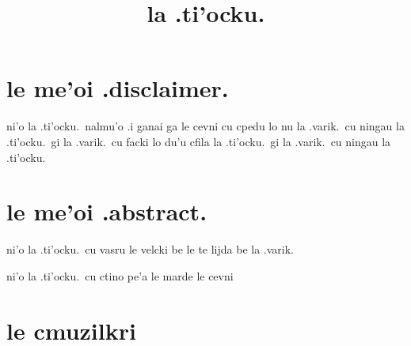 \documentclass{report}
\title{la .ti'ocku.}
\begin{document}
\maketitle

\chapter{le me'oi .disclaimer.}
ni'o la .ti'ocku.\ nalmu'o  .i ganai ga le cevni cu cpedu lo nu la .varik.\ cu ningau la .ti'ocku.\ gi la .varik.\ cu facki lo du'u cfila la .ti'ocku.\ gi la .varik.\ cu ningau la .ti'ocku.

\chapter{le me'oi .abstract.}
ni'o la .ti'ocku.\ cu vasru le velcki be le te lijda be la .varik.

ni'o la .ti'ocku.\ cu ctino pe'a le marde le cevni

\chapter{le cmuzilkri}
\end{document}
